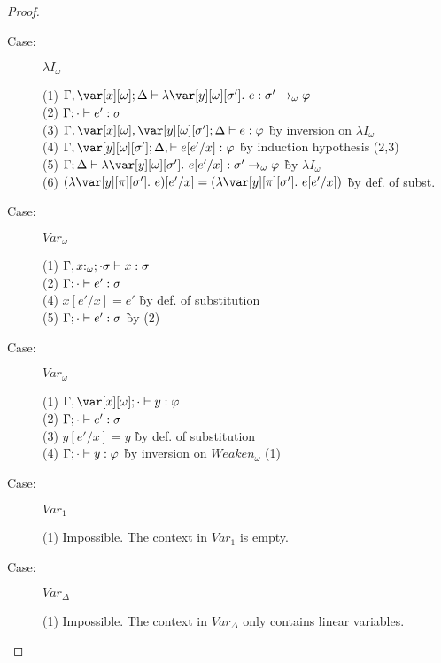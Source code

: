 \begin{proof}
\begin{description}
\item[Case:] $\lambda I_\omega$
\begin{tabbing}
  (1) $\G, \xo; \D \vdash \lambda\y[\omega][\s'].~e : \s'\to_\omega\vp$\\
  (2) $\Gamma; \cdot \vdash e' : \sigma$\\
  (3) $\G, \xo, \y[\omega][\s']; \D \vdash e : \vp$ \` by inversion on $\lambda I_\omega$\\
  (4) $\G, \y[\omega][\s']; \D, \vdash e[e'/x] : \vp$ \` by induction hypothesis (2,3)\\
  (5) $\G; \D \vdash \lambda\y[\omega][\s'].~e[e'/x] : \s' \to_\omega\vp$ \` by $\lambda I_\omega$\\
  (6) $(\lambda \y[\pi][\s'].~e)[e'/x] = (\lambda \y[\pi][\s'].~e[e'/x])$ \` by def. of subst.\\
\end{tabbing}

\item[Case:] $Var_\omega$
\begin{tabbing}
  (1) $\Gamma, x{:}_\omega; \cdot \sigma \vdash x : \sigma$\\
  (2) $\Gamma; \cdot \vdash e' : \sigma$\\
  (4) $x[e'/x] = e'$ \` by def. of substitution\\
  (5) $\Gamma; \cdot \vdash e' : \sigma$ \` by (2)\\
\end{tabbing}

\item[Case:] $Var_\omega$
\begin{tabbing}
  (1) $\G, \xo; \cdot \vdash y : \vp$\\
  (2) $\Gamma; \cdot \vdash e' : \sigma$\\
  (3) $y[e'/x] = y$ \` by def. of substitution\\
  (4) $\Gamma; \cdot \vdash y : \varphi$ \` by inversion on $Weaken_\omega$ (1)\\
\end{tabbing}

\item[Case:] $Var_1$
\begin{tabbing}
  (1) Impossible. The context in $Var_1$ is empty.
\end{tabbing}

\item[Case:] $Var_\Delta$
\begin{tabbing}
  (1) Impossible. The context in $Var_\Delta$ only contains linear variables.
\end{tabbing}


\end{description}
\end{proof}

